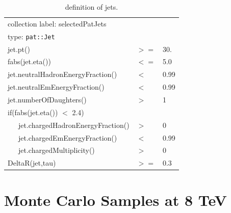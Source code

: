 \begin{table}[htb]
	\caption{definition of jets.}
	\label{table:jetobjdefinition_13TeV}
	\begin{center}
		\ttfamily\scriptsize\selectfont
		\begin{tabular}{|l|ll|}
			\hline
			\multicolumn{3}{|l|}{ collection label: selectedPatJets}\\
			\multicolumn{3}{|l|}{ type: \texttt{pat::Jet}}\\
			\hline
			jet.pt() & $>=$ & 30. \\
			fabs(jet.eta()) & $<=$ & 5.0 \\
			jet.neutralHadronEnergyFraction() & $<$ &  0.99 \\
			jet.neutralEmEnergyFraction() & $<$ & 0.99 \\
			jet.numberOfDaughters() & $>$& 1 \\
			if(fabs(jet.eta()) $<$ 2.4) && \\
			~~~jet.chargedHadronEnergyFraction() & $>$ & 0 \\
			~~~jet.chargedEmEnergyFraction() & $<$ & 0.99 \\
			~~~jet.chargedMultiplicity() & $>$ & 0 \\
			DeltaR(jet,tau) & $>=$ & 0.3 \\
			\hline
		\end{tabular}
	\end{center}
\end{table}

\section{Monte Carlo Samples at 8 TeV}
\label{sec::sampleslist_8tev}

